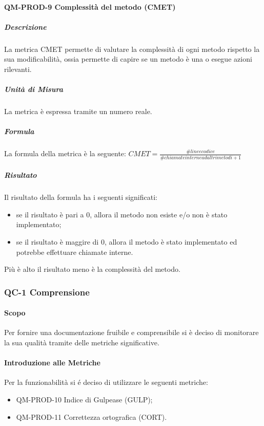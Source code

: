 			\paragraph{QM-PROD-9 Complessità del metodo (CMET)}
				\subparagraph{Descrizione}
					La metrica CMET permette di valutare la complessità di ogni metodo rispetto la sua modificabilità, ossia permette di capire se un metodo è una  o esegue azioni rilevanti.
				\subparagraph{Unità di Misura}
					La metrica è espressa tramite un numero reale.
				\subparagraph{Formula}
					La formula della metrica è la seguente:
					\(
						CMET = \frac{\# linee codice}{\# chiamate interne ad altri metodi+1}
					\)
				\subparagraph{Risultato}
					Il risultato della formula ha i seguenti significati:
					\begin{itemize}
						\item se il risultato è pari a 0, allora il metodo non esiste e/o non è stato implementato;
						\item se il risultato è maggire di 0, allora il metodo è stato implementato ed potrebbe effettuare chiamate interne.
					\end{itemize}
					Più è alto il risultato meno è la complessità del metodo.

		\subsubsection{QC-1 Comprensione}
			\paragraph{Scopo}
				Per fornire una documentazione fruibile e comprensibile si è deciso di monitorare la sua qualità tramite delle metriche significative.
			\paragraph{Introduzione alle Metriche}
				Per la funzionabilità si é deciso di utilizzare le seguenti metriche:
				\begin{itemize}
					\item QM-PROD-10 Indice di Gulpease (GULP);
					\item QM-PROD-11 Correttezza ortografica (CORT).
				\end{itemize}
